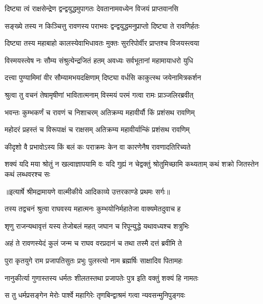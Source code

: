 \twolineshloka
{दिष्ट्या त्वं राक्षसेन्द्रेण द्वन्द्वयुद्धमुपागतः}
{देवतानामवध्येन विजयं प्राप्तवानसि} %

\twolineshloka
{सङ्ख्ये तस्य न किञ्चित्तु रावणस्य पराभवः}
{द्वन्द्वयुद्धमनुप्राप्तो दिष्ट्या ते रावणिर्हतः} %

\twolineshloka
{दिष्ट्या तस्य महाबाहो कालस्येवाभिधावतः}
{मुक्तः सुररिपोर्वीर प्राप्तश्च विजयस्त्वया} %

\twolineshloka
{विस्मयस्त्वेष नः सौम्य संश्रुत्येन्द्रजितं हतम्}
{अवध्यः सर्वभूतानां महामायाधरो युधि} %

\twolineshloka
{दत्त्वा पुण्यामिमां वीर सौम्यामभयदक्षिणाम्}
{दिष्ट्या वर्धसि काकुत्स्थ जयेनामित्रकर्शन} %

\twolineshloka
{श्रुत्वा तु वचनं तेषामृषीणां भावितात्मनाम्}
{विस्मयं परमं गत्वा रामः प्राञ्जलिरब्रवीत्} %

\twolineshloka
{भवन्तः कुम्भकर्णं च रावणं च निशाचरम्}
{अतिक्रम्य महावीर्यौ किं प्रशंसथ रावणिम्} %

\twolineshloka
{महोदरं प्रहस्तं च विरूपाक्षं च राक्षसम्}
{अतिक्रम्य महावीर्यान्किं प्रशंसथ रावणिम्} %

\twolineshloka
{कीदृशो वै प्रभावोऽस्य किं बलं कः पराक्रमः}
{केन वा कारणेनैष रावणादतिरिच्यते} %

\threelineshloka
{शक्यं यदि मया श्रोतुं न खल्वाज्ञापयामि वः}
{यदि गुह्यं न चेद्वक्तुं श्रोतुमिच्छामि कथ्यताम्}
{कथं शक्रो जितस्तेन कथं लब्धवरश्च सः} %


{॥इत्यार्षे श्रीमद्रामायणे वाल्मीकीये आदिकाव्ये उत्तरकाण्डे प्रथमः सर्गः॥}


\twolineshloka
{तस्य तद्वचनं श्रुत्वा राघवस्य महात्मनः}
{कुम्भयोनिर्महातेजा वाक्यमेतदुवाच ह} %

\twolineshloka
{शृणु राजन्यथावृत्तं यस्य तेजोबलं महत्}
{जघान च रिपून्युद्धे यथावध्यश्च शत्रुभिः} %

\twolineshloka
{अहं ते रावणस्येदं कुलं जन्म च राघव}
{वरप्रदानं च तथा तस्मै दत्तं ब्रवीमि ते} %

\twolineshloka
{पुरा कृतयुगे राम प्रजापतिसुतः प्रभुः}
{पुलस्त्यो नाम ब्रह्मर्षिः साक्षादिव पितामहः} %

\twolineshloka
{नानुकीर्त्या गुणास्तस्य धर्मतः शीलतस्तथा}
{प्रजापतेः पुत्र इति वक्तुं शक्यं हि नामतः} %

\twolineshloka
{स तु धर्मप्रसङ्गेन मेरोः पार्श्वे महागिरेः}
{तृणबिन्द्वाश्रमं गत्वा न्यवसन्मुनिपुङ्गवः} %

